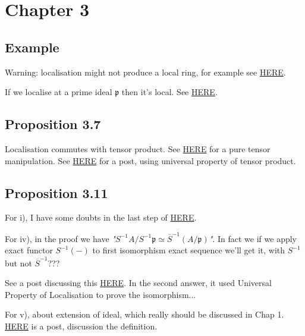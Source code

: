 \section{Chapter 3}

\subsection{Example}

Warning: localisation might not produce a local ring, for example see \href{https://math.stackexchange.com/questions/628371/a-f-is-not-a-local-ring}{HERE}.

If we localise at a prime ideal $\mathfrak p$ then it's local. See \href{https://math.stackexchange.com/questions/300446/why-is-the-localization-at-a-prime-ideal-a-local-ring#:~:text=Well%2C%20any%20proper%20ideal%20m,p%20is%20a%20local%20ring.}{HERE}.

\subsection{Proposition 3.7}

Localisation commutes with tensor product. See \href{http://sporadic.stanford.edu/math210a/sol4.pdf}{HERE} for a pure tensor manipulation. See \href{https://math.stackexchange.com/questions/2292960/localization-commutes-with-tensor-products}{HERE} for a post, using universal property of tensor product.

\subsection{Proposition 3.11}\label{Atiyah Chap 3 Prop 3.11.}

For i), I have some doubts in the last step of \href{https://math.stackexchange.com/questions/375353/every-ideal-of-the-localization-is-an-extended-ideal}{HERE}.

For iv), in the proof we have \textit{"$S^{-1}A/S^{-1}\mathfrak p\simeq \overline{S}^{-1}(A/\mathfrak p)$"}. In fact we if we apply exact functor $S^{-1}(-)$ to first isomorphism exact sequence we'll get it, with $S^{-1}$ but not $\overline{S}^{-1}$???

See a post discussing this \href{https://math.stackexchange.com/questions/1630232/localization-commutes-with-quotient}{HERE}. In the second answer, it used Universal Property of Localisation to prove the isomorphism...

For v), about extension of ideal, which really should be discussed in Chap 1.
\href{https://math.stackexchange.com/questions/367073/about-the-definition-of-extended-ideals}{HERE} is a post, discussion the definition.

